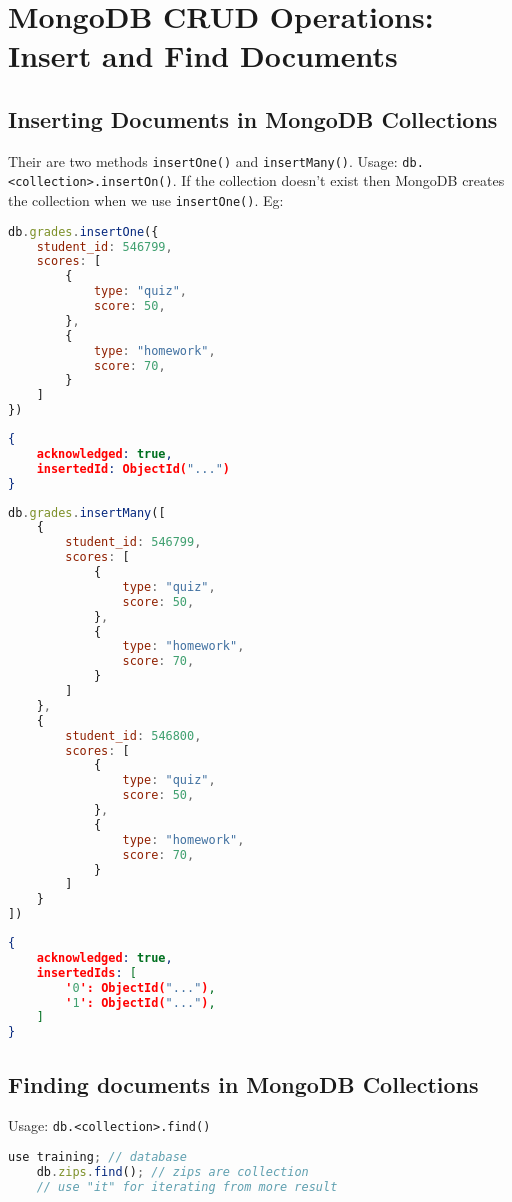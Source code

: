 \documentclass[../main.tex]{subfiles}
\begin{document}
\chapter{MongoDB \gls{CRUD} Operations: Insert and Find Documents}
\section{Inserting Documents in MongoDB Collections}
Their are two methods 
\lstinline {insertOne()} and \lstinline {insertMany()}.
\newline
Usage: \lstinline {db.<collection>.insertOn()}.
If the collection doesn't exist then MongoDB creates the collection when we use \lstinline{insertOne()}.
Eg: 
\begin{lstlisting}[caption=insertOne using mongosh, language=JavaScript]
db.grades.insertOne({
	student_id: 546799, 
	scores: [
		{
			type: "quiz", 
			score: 50,
		},
		{
			type: "homework", 
			score: 70,
		}
	]
})
\end{lstlisting}

\begin{lstlisting}[caption=output of insertOne using mongosh, language=JSON]
{
	acknowledged: true,
	insertedId: ObjectId("...")
}
\end{lstlisting}

\begin{lstlisting}[caption=insertMany using mongosh, language=JavaScript]
db.grades.insertMany([
	{
		student_id: 546799, 
		scores: [
			{
				type: "quiz", 
				score: 50,
			},
			{
				type: "homework", 
				score: 70,
			}
		]
	},
	{
		student_id: 546800, 
		scores: [
			{
				type: "quiz", 
				score: 50,
			},
			{
				type: "homework", 
				score: 70,
			}
		]
	}
])
\end{lstlisting}
\begin{lstlisting}[caption=output of insertMany using mongosh, language=JSON]
{
	acknowledged: true,
	insertedIds: [
		'0': ObjectId("..."),
		'1': ObjectId("..."),
	]
}
\end{lstlisting}

\section{Finding documents in MongoDB Collections}
Usage: \lstinline{db.<collection>.find()}
\begin{lstlisting}[caption=find method in mongosh, language=JavaScript]
	use training; // database 
	db.zips.find(); // zips are collection 
	// use "it" for iterating from more result
\end{lstlisting}
\end{document}
